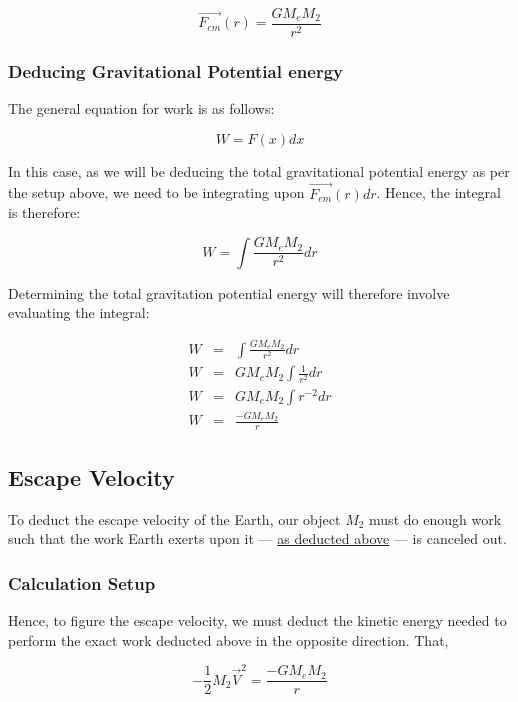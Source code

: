 \documentclass[letterpaper]{article}
\begin{document}
\begin{equation}
\vec{F_{em}}(r) = \frac{GM_eM_2}{r^2}
\end{equation}

\subsubsection{Deducing Gravitational Potential energy}
\label{sec:org77228c3}

The general equation for work is as follows:

\begin{equation}
W = F(x) dx
\end{equation}

In this case, as we will be deducing the total gravitational potential energy as per the setup above, we need to be integrating upon \(\vec{F_{em}}(r) dr\). Hence, the integral is therefore:

\begin{equation}
W = \int{\frac{GM_eM_2}{r^2} dr}
\end{equation}

Determining the total gravitation potential energy will therefore involve evaluating the integral:

\begin{eqnarray}
W &=& \int{\frac{GM_eM_2}{r^2} dr} \\
W &=& GM_eM_2 \int{\frac{1}{r^2} dr} \\
W &=& GM_eM_2 \int{r^{-2} dr} \\
W &=& \frac{-GM_eM_2}{r}
\end{eqnarray}

\subsection{Escape Velocity}
\label{sec:org74b8e45}
To deduct the escape velocity of the Earth, our object \(M_2\) must do enough work such that the work Earth exerts upon it --- \hyperref[sec:org77228c3]{as deducted above} --- is canceled out.

\subsubsection{Calculation Setup}
\label{sec:org39beb04}
Hence, to figure the escape velocity, we must deduct the kinetic energy needed to perform the exact work deducted above in the opposite direction. That,

\begin{equation}
-\frac{1}{2}M_2 \vec{V}^2 = \frac{-GM_eM_2}{r}
\end{equation}
\end{document}
